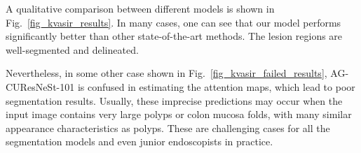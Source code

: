 \documentclass[review, sort&compress]{elsarticle}
\begin{document}
\begin{table}[ht!]
\centering
\caption{Performance metrics of UNet, ResUNet++, PraNet, DoubleUNet, DDANet, ColonSegNet, HarDNet-MSEG and AG-CUResNeSt-101 in Scenario 6, i.e., 5-fold cross-validation on the Kvasir-SEG dataset}
\label{tab_kvasir}
\end{table}


A qualitative comparison between different models is shown in Fig.~\ref{fig_kvasir_results}. In many cases, one can see that our model performs significantly better than other state-of-the-art methods. The lesion regions are well-segmented and delineated.

Nevertheless, in some other case shown in Fig.~\ref{fig_kvasir_failed_results}, AG-CUResNeSt-101 is confused in estimating the attention maps, which lead to poor segmentation results. Usually, these imprecise predictions may occur when the input image contains very large polyps or colon mucosa folds, with many similar appearance characteristics as polyps. These are challenging cases for all the segmentation models and even junior endoscopists in practice.
\end{document}
